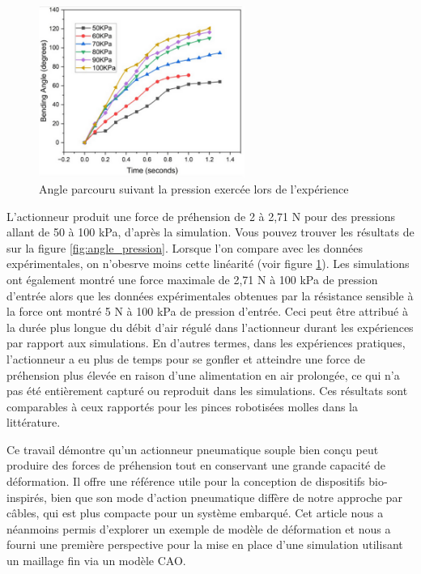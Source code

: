 \documentclass[a4paper, 11pt]{report}
\begin{document}
            \begin{figure}
                \centering
                \includegraphics[width=0.6\textwidth]{Figures/angle_pression_experiments.PNG}
                \caption{Angle parcouru suivant la pression exercée lors de l'expérience \cite{bhat_numerical_2025}}
                \label{fig:angle_pression_experiments}
            \end{figure}

            L'actionneur produit une force de préhension de 2 à 2,71 N pour des pressions allant de 50 à 100 kPa, d'après la simulation. Vous pouvez trouver les résultats de sur la figure \ref{fig:angle_pression}. Lorsque l'on compare avec les données expérimentales, on n'obesrve moins cette linéarité (voir figure \ref{fig:angle_pression_experiments}). Les simulations ont également montré une force maximale de 2,71 N à 100 kPa de pression d'entrée alors que les données expérimentales obtenues par la résistance sensible à la force ont montré 5 N à 100 kPa de pression d'entrée. Ceci peut être attribué à la durée plus longue du débit d'air régulé dans l'actionneur durant les expériences par rapport aux simulations. En d'autres termes, dans les expériences pratiques, l'actionneur a eu plus de temps pour se gonfler et atteindre une force de préhension plus élevée en raison d'une alimentation en air prolongée, ce qui n'a pas été entièrement capturé ou reproduit dans les simulations. Ces résultats sont comparables à ceux rapportés pour les pinces robotisées molles dans la littérature. \cite{bhat_numerical_2025}

            Ce travail démontre qu'un actionneur pneumatique souple bien conçu peut produire des forces de préhension tout en conservant une grande capacité de déformation. Il offre une référence utile pour la conception de dispositifs bio-inspirés, bien que son mode d'action pneumatique diffère de notre approche par câbles, qui est plus compacte pour un système embarqué. Cet article nous a néanmoins permis d'explorer un exemple de modèle de déformation et nous a fourni une première perspective pour la mise en place d'une simulation utilisant un maillage fin via un modèle CAO.
\end{document}
